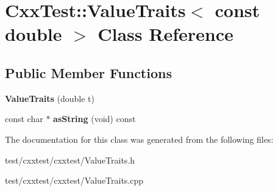 \hypertarget{classCxxTest_1_1ValueTraits_3_01const_01double_01_4}{\section{Cxx\-Test\-:\-:Value\-Traits$<$ const double $>$ Class Reference}
\label{classCxxTest_1_1ValueTraits_3_01const_01double_01_4}
}
\subsection*{Public Member Functions}
\begin{DoxyCompactItemize}
\item 
\hypertarget{classCxxTest_1_1ValueTraits_3_01const_01double_01_4_aa3c1d7e00f939ec6f439d64f4c9017e4}{{\bfseries Value\-Traits} (double t)}\label{classCxxTest_1_1ValueTraits_3_01const_01double_01_4_aa3c1d7e00f939ec6f439d64f4c9017e4}

\item 
\hypertarget{classCxxTest_1_1ValueTraits_3_01const_01double_01_4_a07ccd4db05581349920427fc746f6aff}{const char $\ast$ {\bfseries as\-String} (void) const }\label{classCxxTest_1_1ValueTraits_3_01const_01double_01_4_a07ccd4db05581349920427fc746f6aff}

\end{DoxyCompactItemize}


The documentation for this class was generated from the following files\-:\begin{DoxyCompactItemize}
\item 
test/cxxtest/cxxtest/Value\-Traits.\-h\item 
test/cxxtest/cxxtest/Value\-Traits.\-cpp\end{DoxyCompactItemize}
